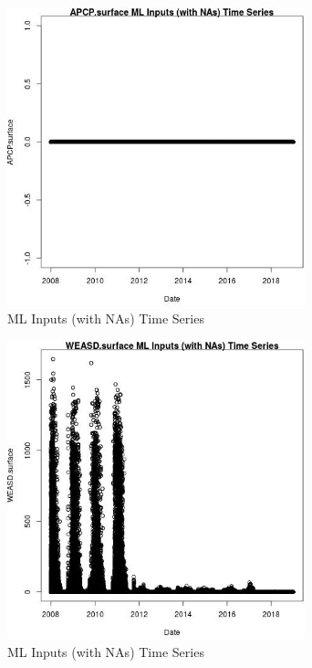 \begin{figure} 
\centering  
\includegraphics[width=0.77\textwidth]{Code_Outputs/Report_ML_input_PM25_Step4_part_e_de_duplicated_aves_compiled_2019-05-21wNAs_APCPsurfacevDate.jpg} 
\caption{\label{fig:Report_ML_input_PM25_Step4_part_e_de_duplicated_aves_compiled_2019-05-21wNAsAPCPsurfacevDate}ML Inputs (with NAs) Time Series} 
\end{figure} 
 

\begin{figure} 
\centering  
\includegraphics[width=0.77\textwidth]{Code_Outputs/Report_ML_input_PM25_Step4_part_e_de_duplicated_aves_compiled_2019-05-21wNAs_WEASDsurfacevDate.jpg} 
\caption{\label{fig:Report_ML_input_PM25_Step4_part_e_de_duplicated_aves_compiled_2019-05-21wNAsWEASDsurfacevDate}ML Inputs (with NAs) Time Series} 
\end{figure} 
 

